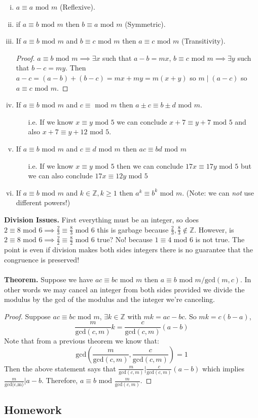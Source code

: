 \documentclass[class=article, crop=false]{standalone}
\def\integers{{\mathbb Z}}
\begin{document}
\begin{enumerate}[(i)]
	\item $a\equiv a\mbox{ mod }m$ (Reflexive).
	\item if $a\equiv b\mbox{ mod }m$ then $b\equiv a\mbox{ mod }m$ (Symmetric).
	\item If $a\equiv b\mbox{ mod }m$ and $b\equiv c\mbox{ mod }m$ then $a\equiv c\mbox{ mod }m$ (Transitivity).
		\begin{proof}
			$a\equiv b\mbox{ mod }m \implies \exists x$ such that $a-b=mx$,
			$b\equiv c\mbox{ mod }m \implies \exists y$ such that $b-c=my$. Then 
			$a-c = (a-b)+(b-c) =mx+my = m(x+y)$ so $m\mid (a-c)$ so $a\equiv c\mbox{ mod }m$.
		\end{proof}
	\item If $a\equiv b\mbox{ mod }m$ and $c\equiv \mbox{ mod }m$ then $a\pm c \equiv b\pm d \mbox{ mod }m$.
		\begin{itemize}
			\item[i.e.] If we know $x\equiv y\mbox{ mod } 5$ we can conclude $x+7\equiv y+7\mbox{ mod }5$ and also
				$x+7 \equiv y+12 \mbox{ mod }5$.  
		\end{itemize}
	\item If $a\equiv b\mbox{ mod }m$ and $c\equiv d\mbox{ mod }m$ then $ac\equiv bd\mbox{ mod }m$
		\begin{itemize}
			\item[i.e.] If we know $x\equiv y\mbox{ mod }5$ then we can conclude $17x\equiv 17y\mbox{ mod }5$
				but we can also conclude $17x\equiv 12y\mbox{ mod }5$  
		\end{itemize}
	\item If $a\equiv b\mbox{ mod }m$ and $k\in\integers, k\geq 1$ then $a^k \equiv b^k \mbox{ mod }m$.
		(Note: we can \emph{not} use different powers!)
\end{enumerate}
\textbf{Division Issues.} First everything must be an integer, so does
$2\equiv 8\mbox{ mod }6\implies \frac{2}{3} \equiv \frac{8}{3} \mbox{ mod }6$ this is garbage because $\frac{2}{3}, \frac{8}{3}\notin\integers$.
However, is $2\equiv 8\mbox{ mod }6\implies \frac{2}{2}\equiv \frac{8}{2}\mbox{ mod }6$ true? No! because
$1\equiv 4\mbox{ mod }6$ is not true. The point is even if division makes both sides integers there is no guarantee
that the congruence is preserved!\\\\
\textbf{Theorem.} Suppose we have $ac \equiv bc\mbox{ mod } m$ then $a\equiv b\mbox{ mod } m/\mbox{gcd}(m,c)$.
In other words we may cancel an integer from both sides provided we divide the modulus by the gcd of the
modulus and the integer we're canceling.
\begin{proof}
	Suppose $ac\equiv bc\mbox{ mod }m$, $\exists k\in\integers$ with $mk=ac-bc$. So
	$mk=c(b-a)$, $$\frac{m}{\mbox{gcd}(c,m)}k = \frac{c}{\mbox{gcd}(c,m)}(a-b)$$
	Note that from a previous theorem we know that: $$\mbox{gcd}\left(\frac{m}{\mbox{gcd}(c,m)},\frac{c}{\mbox{gcd}(c,m)}\right) = 1$$
	Then the above statement says that $\frac{m}{\mbox{gcd}(c,m)} \Big| \frac{c}{\mbox{gcd}(c,m)}(a-b)$
	which implies $\frac{m}{\mbox{gcd(c,m)}}\Big|a-b$.
	Therefore, $a\equiv b\mbox{ mod }\frac{m}{\mbox{gcd}(c,m)}$.
\end{proof}
\subsection{Homework}
\end{document}
